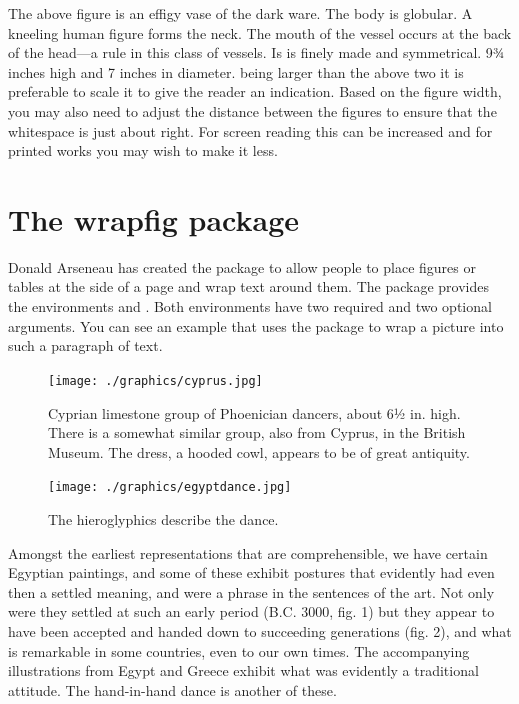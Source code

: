 \begin{dispListing}
The above figure is an effigy vase of the dark ware. The body is globular. A kneeling human figure forms the neck. The mouth of the vessel occurs at the back of the head—a rule in this class of vessels. Is is finely made and symmetrical. 9¾ inches high and 7 inches in diameter. being larger than the above two it is preferable to scale it to give the reader an indication. Based on the figure width, you may also need to adjust the distance between the figures to ensure that the whitespace is just about right. For screen reading this can be increased and for printed works you may wish to make it less.



\section{The wrapfig package}


\captionsetup[wrapfigure]{margin=10pt,font=small,labelfont=bf, name=Fig.} %


Donald Arseneau has created the  package to allow people to place figures or
tables at the side of a page and wrap text around them. The package provides the
environments  and . Both environments have two required and
two optional arguments. You can see an example that uses the package to wrap a picture into such a paragraph of text.

\begin{figure}[htbp]
   \texttt{[image: ./graphics/cyprus.jpg]} 
   \caption{Cyprian limestone group of Phoenician dancers, about 6½ in. high. There is a somewhat similar group, also from Cyprus, in the British Museum. The dress, a hooded cowl, appears to be of great antiquity.}
\end{figure}

\begin{figure}
\centering\small
\texttt{[image: ./graphics/egyptdance.jpg]}  
\caption{The hieroglyphics describe the dance.}
\end{figure}
Amongst the earliest representations that are comprehensible, we have certain Egyptian paintings, and some of these exhibit postures that evidently had even then a settled meaning, and were a phrase in the sentences of the art. Not only were they settled at such an early period (B.C. 3000, fig. 1) but they appear to have been accepted and handed down to succeeding generations (fig. 2), and what is remarkable in some countries, even to our own times. The accompanying illustrations from Egypt and Greece exhibit what was evidently a traditional attitude. The hand-in-hand dance is another of these.


\end{dispListing}
